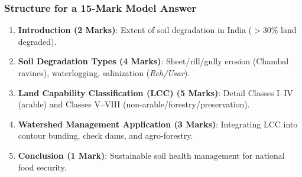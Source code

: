\documentclass[11pt,a4paper]{article}
\begin{document}
\subsubsection{Structure for a 15-Mark Model Answer}
\begin{enumerate}[leftmargin=*]
  \item \textbf{Introduction (2 Marks)}: Extent of soil degradation in India ($>30\%$ land degraded).
  \item \textbf{Soil Degradation Types (4 Marks)}: Sheet/rill/gully erosion (Chambal ravines), waterlogging, salinization (\textit{Reh/Usar}).
  \item \textbf{Land Capability Classification (LCC) (5 Marks)}: Detail Classes I--IV (arable) and Classes V--VIII (non-arable/forestry/preservation).
  \item \textbf{Watershed Management Application (3 Marks)}: Integrating LCC into contour bunding, check dams, and agro-forestry.
  \item \textbf{Conclusion (1 Mark)}: Sustainable soil health management for national food security.
\end{enumerate}
\end{document}
